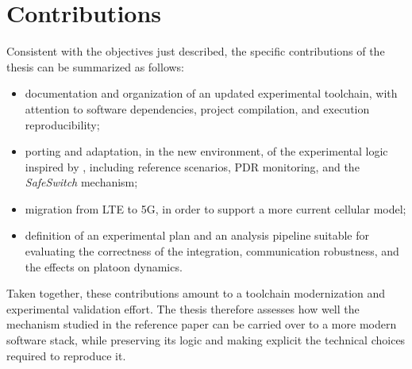 \section{Contributions}

Consistent with the objectives just described, the specific contributions of the thesis can be summarized as follows:
\begin{itemize}
\item documentation and organization of an updated experimental toolchain, with attention to software dependencies, project compilation, and execution reproducibility;
\item porting and adaptation, in the new environment, of the experimental logic inspired by \cite{segata2023multi-technology}, including reference scenarios, PDR monitoring, and the \emph{SafeSwitch} mechanism;
\item migration from LTE to 5G, in order to support a more current cellular model;
\item definition of an experimental plan and an analysis pipeline suitable for evaluating the correctness of the integration, communication robustness, and the effects on platoon dynamics.
\end{itemize}

Taken together, these contributions amount to a toolchain modernization and experimental validation effort. The thesis therefore assesses how well the mechanism studied in the reference paper can be carried over to a more modern software stack, while preserving its logic and making explicit the technical choices required to reproduce it.
